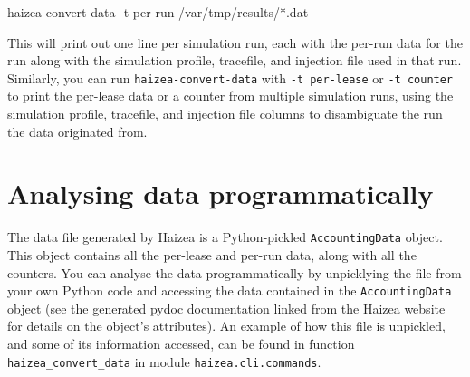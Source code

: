 \begin{shellverbatim}
haizea-convert-data -t per-run /var/tmp/results/*.dat
\end{shellverbatim}

This will print out one line per simulation run, each with the per-run data for the run along with the simulation profile, tracefile, and injection file used in that run. Similarly, you can run \texttt{haizea-convert-data} with \texttt{-t per-lease} or \texttt{-t counter} to print the per-lease data or a counter from multiple simulation runs, using the simulation profile, tracefile, and injection file columns to disambiguate the run the data originated from.

\section{Analysing data programmatically} 

The data file generated by Haizea is a Python-pickled \texttt{AccountingData} object. This object contains all the per-lease and per-run data, along with all the counters. You can analyse the data programmatically by unpicklying the file from your own Python code and accessing the data contained in the \texttt{AccountingData} object (see the generated pydoc documentation linked from the Haizea website for details on the object's attributes). An example of how this file is unpickled, and some of its information accessed, can be found in function \texttt{haizea\_convert\_data} in module \texttt{haizea.cli.commands}.


